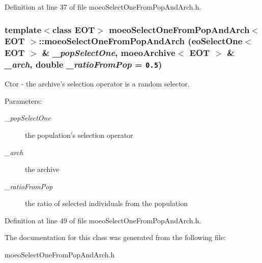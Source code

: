 Definition at line 37 of file moeo\-Select\-One\-From\-Pop\-And\-Arch.h.
\subsubsection{\setlength{\rightskip}{0pt plus 5cm}template$<$class EOT$>$ {\bf moeo\-Select\-One\-From\-Pop\-And\-Arch}$<$ EOT $>$::{\bf moeo\-Select\-One\-From\-Pop\-And\-Arch} ({\bf eo\-Select\-One}$<$ EOT $>$ \& {\em \_\-pop\-Select\-One}, {\bf moeo\-Archive}$<$ EOT $>$ \& {\em \_\-arch}, double {\em \_\-ratio\-From\-Pop} = {\tt 0.5})\hspace{0.3cm}{\tt  [inline]}}\label{classmoeoSelectOneFromPopAndArch_1aeab159a74bf4cd171e2045e25be2b7}


Ctor - the archive's selection operator is a random selector. 

\begin{Desc}
\item[Parameters:]
\begin{description}
\item[{\em \_\-pop\-Select\-One}]the population's selection operator \item[{\em \_\-arch}]the archive \item[{\em \_\-ratio\-From\-Pop}]the ratio of selected individuals from the population \end{description}
\end{Desc}


Definition at line 49 of file moeo\-Select\-One\-From\-Pop\-And\-Arch.h.

The documentation for this class was generated from the following file:\begin{CompactItemize}
\item 
moeo\-Select\-One\-From\-Pop\-And\-Arch.h\end{CompactItemize}
